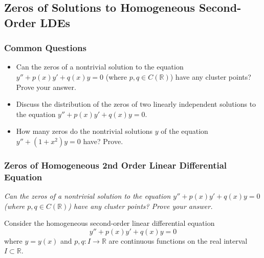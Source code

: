 \documentclass[11pt, a4paper]{article}
\newcommand{\question}[1]{\textit{#1}\vspace{2mm}}
\newcommand{\R}{\mathbb{R}} %
\begin{document}
\subsection{Zeros of Solutions to Homogeneous Second-Order LDEs}

\subsubsection{Common Questions}
\begin{itemize}
		
	\item Can the zeros of a nontrivial solution to the equation $ y'' + p(x)y' + q(x)y = 0 $ (where $ p, q \in C(\R) $) have any cluster points? Prove your answer.
	
	\item Discuss the distribution of the zeros of two linearly independent solutions to the equation  $ y'' + p(x)y' + q(x)y = 0 $.
	
	\item How many zeros do the nontrivial solutions $ y $ of the equation $ y'' + (1+x^2)y = 0 $ have? Prove.
	
\end{itemize}

\subsubsection{Zeros of Homogeneous 2nd Order Linear Differential Equation}
\question{Can the zeros of a nontrivial solution to the equation $ y'' + p(x)y' + q(x)y = 0 $ (where $ p, q \in C(\R) $) have any cluster points? Prove your answer.}

Consider the homogeneous second-order linear differential equation 
\begin{equation}
	y'' + p(x) y' + q(x) y = 0 \label{eq:ldeR}
\end{equation}
where $ y = y(x) $ and $ p, q : I \to \R $ are continuous functions on the real interval $ I \subset \R $. 
\end{document}
